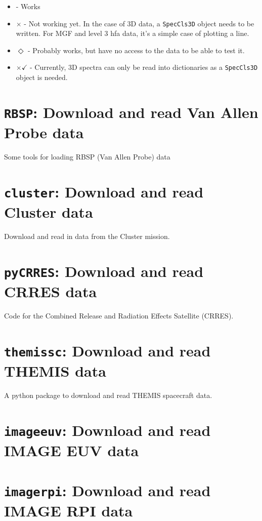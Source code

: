 	\begin{itemize}
	\item \checkmark - Works
	\item $\times$ - Not working yet. In the case of 3D data, a \texttt{SpecCls3D} object needs to be written. For MGF and level 3 hfa data, it's a simple case of plotting a line.
	\item $\Diamond$ - Probably works, but have no access to the data to be able to test it.
	\item $\times\checkmark$ - Currently, 3D spectra can only be read into dictionaries as a \texttt{SpecCls3D} object is needed.
	\end{itemize}


	\section{\texttt{RBSP}: Download and read Van Allen Probe data}
	
	Some tools for loading RBSP (Van Allen Probe) data


	\section{\texttt{cluster}: Download and read Cluster data}

	Download and read in data from the Cluster mission.


	\section{\texttt{pyCRRES}: Download and read CRRES data}

	Code for the Combined Release and Radiation Effects Satellite (CRRES).


	\section{\texttt{themissc}:  Download and read THEMIS data}

	A python package to download and read THEMIS spacecraft data.

	\section{\texttt{imageeuv}: Download and read IMAGE EUV data}

	\section{\texttt{imagerpi}: Download and read IMAGE RPI data}

